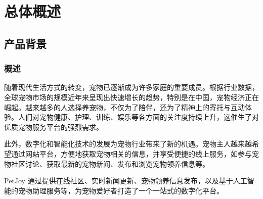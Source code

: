 \section{总体概述}\label{sec:General_Description}

\subsection{产品背景}

\subsubsection{概述}

随着现代生活方式的转变，宠物已逐渐成为许多家庭的重要成员。根据行业数据，全球宠物市场的规模近年来呈现出快速增长的趋势，特别是在中国，宠物经济正在崛起。越来越多的人选择养宠物，不仅为了陪伴，还为了精神上的寄托与互动体验。人们对宠物健康、护理、训练、娱乐等各方面的关注度持续上升，这催生了对优质宠物服务平台的强烈需求。

此外，数字化和智能化技术的发展为宠物行业带来了新的机遇。宠物主人越来越希望通过网站平台，方便地获取宠物相关的信息，并享受便捷的线上服务，如参与宠物社区讨论、获取最新的宠物新闻、发布和浏览宠物领养信息等。

PetJoy 通过提供在线社区、实时新闻更新、宠物领养信息发布，以及基于人工智能的宠物助理服务等，为宠物爱好者打造了一个一站式的数字化平台。

